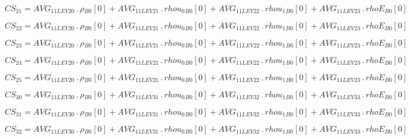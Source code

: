 \documentclass{article}
\begin{document}
\begin{dmath}CS_{21} = AVG_{1 1 LEV 20} \,.\, {\rho{_{B0}}}[{0}] + AVG_{1 1 LEV 21} \,.\, {rhou_{0}{_{B0}}}[{0}] + AVG_{1 1 LEV 22} \,.\, {rhou_{1}{_{B0}}}[{0}] + AVG_{1 1 LEV 23} \,.\, {rhoE{_{B0}}}[{0}]\end{dmath}

\begin{dmath}CS_{22} = AVG_{1 1 LEV 20} \,.\, {\rho{_{B0}}}[{0}] + AVG_{1 1 LEV 21} \,.\, {rhou_{0}{_{B0}}}[{0}] + AVG_{1 1 LEV 22} \,.\, {rhou_{1}{_{B0}}}[{0}] + AVG_{1 1 LEV 23} \,.\, {rhoE{_{B0}}}[{0}]\end{dmath}

\begin{dmath}CS_{23} = AVG_{1 1 LEV 20} \,.\, {\rho{_{B0}}}[{0}] + AVG_{1 1 LEV 21} \,.\, {rhou_{0}{_{B0}}}[{0}] + AVG_{1 1 LEV 22} \,.\, {rhou_{1}{_{B0}}}[{0}] + AVG_{1 1 LEV 23} \,.\, {rhoE{_{B0}}}[{0}]\end{dmath}

\begin{dmath}CS_{24} = AVG_{1 1 LEV 20} \,.\, {\rho{_{B0}}}[{0}] + AVG_{1 1 LEV 21} \,.\, {rhou_{0}{_{B0}}}[{0}] + AVG_{1 1 LEV 22} \,.\, {rhou_{1}{_{B0}}}[{0}] + AVG_{1 1 LEV 23} \,.\, {rhoE{_{B0}}}[{0}]\end{dmath}

\begin{dmath}CS_{25} = AVG_{1 1 LEV 20} \,.\, {\rho{_{B0}}}[{0}] + AVG_{1 1 LEV 21} \,.\, {rhou_{0}{_{B0}}}[{0}] + AVG_{1 1 LEV 22} \,.\, {rhou_{1}{_{B0}}}[{0}] + AVG_{1 1 LEV 23} \,.\, {rhoE{_{B0}}}[{0}]\end{dmath}

\begin{dmath}CS_{30} = AVG_{1 1 LEV 30} \,.\, {\rho{_{B0}}}[{0}] + AVG_{1 1 LEV 31} \,.\, {rhou_{0}{_{B0}}}[{0}] + AVG_{1 1 LEV 32} \,.\, {rhou_{1}{_{B0}}}[{0}] + AVG_{1 1 LEV 33} \,.\, {rhoE{_{B0}}}[{0}]\end{dmath}

\begin{dmath}CS_{31} = AVG_{1 1 LEV 30} \,.\, {\rho{_{B0}}}[{0}] + AVG_{1 1 LEV 31} \,.\, {rhou_{0}{_{B0}}}[{0}] + AVG_{1 1 LEV 32} \,.\, {rhou_{1}{_{B0}}}[{0}] + AVG_{1 1 LEV 33} \,.\, {rhoE{_{B0}}}[{0}]\end{dmath}

\begin{dmath}CS_{32} = AVG_{1 1 LEV 30} \,.\, {\rho{_{B0}}}[{0}] + AVG_{1 1 LEV 31} \,.\, {rhou_{0}{_{B0}}}[{0}] + AVG_{1 1 LEV 32} \,.\, {rhou_{1}{_{B0}}}[{0}] + AVG_{1 1 LEV 33} \,.\, {rhoE{_{B0}}}[{0}]\end{dmath}
\end{document}
